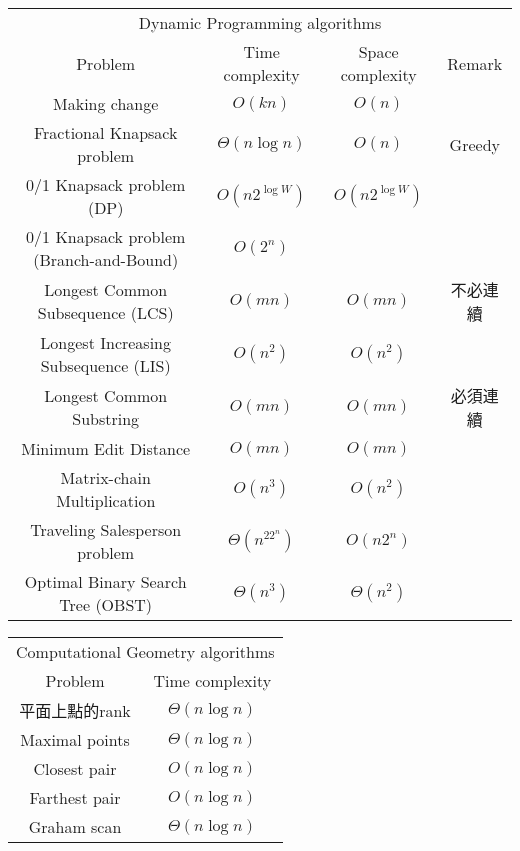 \begin{table}[H]
    \centering
    \begin{tabular}{|c|c|c|c|}
        \hline
        \multicolumn{4}{|c|}{Dynamic Programming algorithms} \\
        \Xhline{3\arrayrulewidth}
        Problem & Time complexity & Space complexity & Remark \\
        \Xhline{2\arrayrulewidth}
        Making change & $O(kn)$ & $O(n)$ & \\
        \hline
        Fractional Knapsack problem & $\Theta(n\log n)$ & $O(n)$ & Greedy \\
        \hline
        0/1 Knapsack problem (DP) & $O(n2^{\log W})$ & $O(n2^{\log W})$ & \\
        \hline
        0/1 Knapsack problem (Branch-and-Bound) & $O(2^n)$ & & \\
        \hline
        Longest Common Subsequence (LCS) & $O(mn)$ & $O(mn)$ & 不必連續 \\
        \hline
        Longest Increasing Subsequence (LIS) & $O(n^2)$ & $O(n^2)$ & \\
        \hline
        Longest Common Substring & $O(mn)$ & $O(mn)$ & 必須連續 \\
        \hline
        Minimum Edit Distance & $O(mn)$ & $O(mn)$ & \\
        \hline
        Matrix-chain Multiplication & $O(n^3)$ & $O(n^2)$ & \\
        \hline
        Traveling Salesperson problem & $\Theta(n^22^n)$ & $O(n2^n)$ & \\
        \hline
        Optimal Binary Search Tree (OBST) & $\Theta(n^3)$ & $\Theta(n^2)$ & \\
        \hline
    \end{tabular}
\end{table}

\begin{table}[H]
    \centering
    \begin{tabular}{|c|c|}
        \hline
        \multicolumn{2}{|c|}{Computational Geometry algorithms} \\
        \Xhline{3\arrayrulewidth}
        Problem & Time complexity \\
        \Xhline{2\arrayrulewidth}
        平面上點的rank & $\Theta(n\log n)$ \\
        \hline
        Maximal points & $\Theta(n\log n)$ \\
        \hline
        Closest pair & $O(n\log n)$ \\
        \hline
        Farthest pair & $O(n\log n)$ \\
        \hline
        Graham scan & $\Theta(n\log n)$ \\
        \hline
    \end{tabular}
\end{table}

\pagebreak